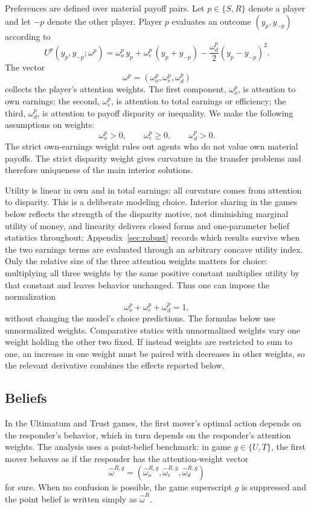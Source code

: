\documentclass[11pt]{article}
\theoremstyle{plain}
\theoremstyle{remark}
\begin{document}
Preferences are defined over material payoff pairs.  Let $p\in\{S,R\}$ denote a player and let $-p$ denote the other player.  Player $p$ evaluates an outcome $(y_p,y_{-p})$ according to
\begin{equation}
\label{eq:utility_general}
        U^p(y_p,y_{-p};\omega^p)
        =
        \omega_o^p\,y_p
        +\omega_e^p\,(y_p+y_{-p})
        -\frac{\omega_d^p}{2}(y_p-y_{-p})^2 .
\end{equation}
The vector
\[
        \omega^p=(\omega_o^p,\omega_e^p,\omega_d^p)
\]
collects the player's attention weights.  The first component, $\omega_o^p$, is attention to own earnings; the second, $\omega_e^p$, is attention to total earnings or efficiency; the third, $\omega_d^p$, is attention to payoff disparity or inequality.  We make the following assumptions on weights:
\[
        \omega_o^p>0,\qquad \omega_e^p\ge0,\qquad \omega_d^p>0.
\]
The strict own-earnings weight rules out agents who do not value own material payoffs.  The strict disparity weight gives curvature in the transfer problems and therefore uniqueness of the main interior solutions.  

Utility is linear in own and in total earnings: all curvature comes from attention to disparity.  This is a deliberate modeling choice.  Interior sharing in the games below reflects the strength of the disparity motive, not diminishing marginal utility of money, and linearity delivers closed forms and one-parameter belief statistics throughout; Appendix~\ref{sec:robust} records which results survive when the two earnings terms are evaluated through an arbitrary concave utility index.  Only the relative size of the three attention weights matters for choice: multiplying all three weights by the same positive constant multiplies utility by that constant and leaves behavior unchanged.  Thus one can impose the normalization
\[
        \omega_o^p+\omega_e^p+\omega_d^p=1,
\]
without changing the model's choice predictions.  The formulas below use unnormalized weights.  Comparative statics with unnormalized weights vary one weight holding the other two fixed.  If instead weights are restricted to sum to one, an increase in one weight must be paired with decreases in other weights, so the relevant derivative combines the effects reported below.

\subsection{Beliefs}

In the Ultimatum and Trust games, the first mover's optimal action depends on the responder's behavior, which in turn depends on the responder's attention weights.  The analysis uses a point-belief benchmark: in game $g\in\{U,T\}$, the first mover behaves as if the responder has the attention-weight vector
\[
        \hat\omega^{R,g}
        =
        (\hat\omega_o^{R,g},\hat\omega_e^{R,g},\hat\omega_d^{R,g})
\]
for sure.  When no confusion is possible, the game superscript $g$ is suppressed and the point belief is written simply as $\hat\omega^R$.
\end{document}
